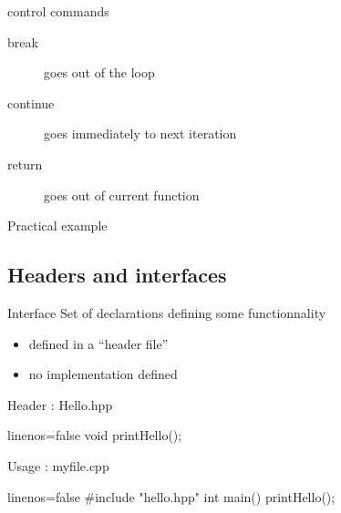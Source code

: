 \begin{frame}[fragile]
  \begin{block}{control commands}
    \begin{description}
    \item[break] goes out of the loop
    \item[continue] goes immediately to next iteration
    \item[return] goes out of current function
    \end{description}
  \end{block}
  \pause
  \begin{exampleblock}{Practical example}
  \end{exampleblock}
\end{frame}

\subsection[Headers]{Headers and interfaces}

\begin{frame}[fragile]
  \begin{block}{Interface}
    Set of declarations defining some functionnality
    \begin{itemize}
    \item defined in a ``header file''
    \item no implementation defined
    \end{itemize}
  \end{block}
  \begin{block}{Header : Hello.hpp}
    \begin{cppcode*}{linenos=false}
      void printHello();
    \end{cppcode*}
  \end{block}
  \begin{block}{Usage : myfile.cpp}
    \begin{cppcode*}{linenos=false}
      #include "hello.hpp"
      int main() {
        printHello();
      }
    \end{cppcode*}  
  \end{block}
\end{frame}

